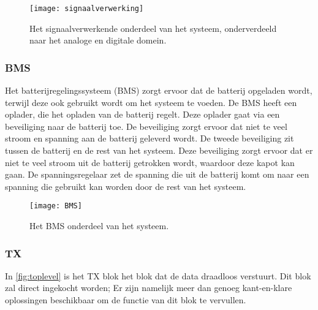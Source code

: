 \begin{figure}[ht]
    \centering
    \texttt{[image: signaalverwerking]}
    \caption{Het signaalverwerkende onderdeel van het systeem, onderverdeeld naar het analoge en digitale domein.}
    \label{fig:signaalverwerking}
\end{figure}

\subsubsection{BMS}
Het batterijregelingssysteem (BMS) zorgt ervoor dat de batterij opgeladen wordt, terwijl deze ook gebruikt wordt om het systeem te voeden.
De BMS heeft een oplader, die het opladen van de batterij regelt. Deze oplader gaat via een beveiliging naar de batterij toe. De beveiliging zorgt ervoor dat niet te veel stroom en spanning aan de batterij geleverd wordt. De tweede beveiliging zit tussen de batterij en de rest van het systeem. Deze beveiliging zorgt ervoor dat er niet te veel stroom uit de batterij getrokken wordt, waardoor deze kapot kan gaan. De spanningsregelaar zet de spanning die uit de batterij komt om naar een spanning die gebruikt kan worden door de rest van het systeem. 

\begin{figure}[ht]
    \centering
    \texttt{[image: BMS]}
    \caption{Het BMS onderdeel van het systeem.}
    \label{fig:BMS}
\end{figure}

\subsubsection{TX}
In \autoref{fig:toplevel} is het TX blok het blok dat de data draadloos verstuurt. Dit blok zal direct ingekocht worden; Er zijn namelijk meer dan genoeg kant-en-klare oplossingen beschikbaar om de functie van dit blok te vervullen.